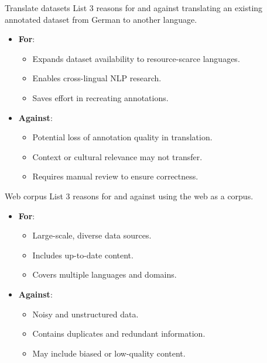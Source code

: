 \documentclass{article}
\begin{document}
\begin{exercise}{Translate datasets}
  List 3 reasons for and against translating an existing annotated dataset from German to another language.

  \begin{solution}
    \begin{itemize}
        \item \textbf{For}:
        \begin{itemize}
            \item Expands dataset availability to resource-scarce languages.
            \item Enables cross-lingual NLP research.
            \item Saves effort in recreating annotations.
        \end{itemize}
        \item \textbf{Against}:
        \begin{itemize}
            \item Potential loss of annotation quality in translation.
            \item Context or cultural relevance may not transfer.
            \item Requires manual review to ensure correctness.
        \end{itemize}
    \end{itemize}
  \end{solution}
\end{exercise}

\begin{exercise}{Web corpus}
  List 3 reasons for and against using the web as a corpus.

  \begin{solution}
    \begin{itemize}
        \item \textbf{For}:
        \begin{itemize}
            \item Large-scale, diverse data sources.
            \item Includes up-to-date content.
            \item Covers multiple languages and domains.
        \end{itemize}
        \item \textbf{Against}:
        \begin{itemize}
            \item Noisy and unstructured data.
            \item Contains duplicates and redundant information.
            \item May include biased or low-quality content.
        \end{itemize}
    \end{itemize}
  \end{solution}
\end{exercise}
\end{document}
